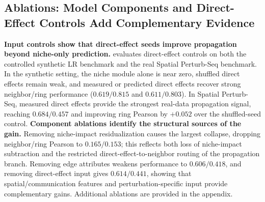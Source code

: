 \documentclass[sigconf,review,balance=false]{acmart}
\begin{document}
\subsection{Ablations: Model Components and Direct-Effect Controls Add Complementary Evidence}
\label{sec:ablations}
\noindent\textbf{Input controls show that direct-effect seeds improve propagation beyond niche-only prediction.}
 evaluates direct-effect controls on both the controlled synthetic LR benchmark and the real Spatial Perturb-Seq benchmark. In the synthetic setting, the niche module alone is near zero, shuffled direct effects remain weak, and measured or predicted direct effects recover strong neighbor/ring performance ($0.619/0.815$ and $0.611/0.803$). In Spatial Perturb-Seq, measured direct effects provide the strongest real-data propagation signal, reaching $0.684/0.457$ and improving ring Pearson by $+0.052$ over the shuffled-seed control.
\noindent\textbf{Component ablations identify the structural sources of the gain.}
Removing niche-impact residualization causes the largest collapse, dropping neighbor/ring Pearson to $0.165/0.153$; this reflects both loss of niche-impact subtraction and the restricted direct-effect-to-neighbor routing of the propagation branch. Removing edge attributes weakens performance to $0.606/0.418$, and removing direct-effect input gives $0.614/0.441$, showing that spatial/communication features and perturbation-specific input provide complementary gains. Additional ablations are provided in the appendix.
\end{document}
